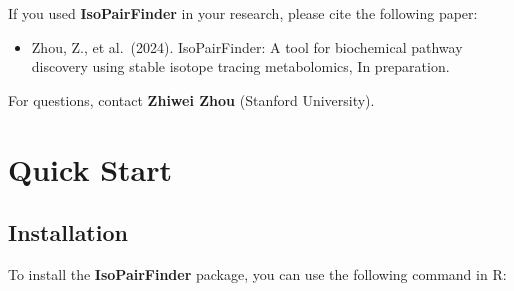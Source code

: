 \documentclass[
  letterpaper,
  DIV=11,
  numbers=noendperiod]{scrreprt}
\providecommand{\tightlist}{%
  \setlength{\itemsep}{0pt}\setlength{\parskip}{0pt}}
\begin{document}
If you used \textbf{IsoPairFinder} in your research, please cite the
following paper:

\begin{itemize}
\tightlist
\item
  Zhou, Z., et al.~(2024). IsoPairFinder: A tool for biochemical pathway
  discovery using stable isotope tracing metabolomics, In preparation.
\end{itemize}

For questions, contact \textbf{Zhiwei Zhou} (Stanford University).


\chapter{Quick Start}\label{sec-quick-start}

\section{Installation}\label{installation}

To install the \textbf{IsoPairFinder} package, you can use the following
command in R:
\end{document}
